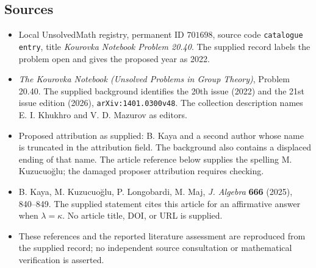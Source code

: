 \documentclass[11pt]{article}
\begin{document}
\subsection{Sources}
\begin{itemize}
\item Local UnsolvedMath registry, permanent ID \(701698\), source code \texttt{catalogue entry}, title \emph{Kourovka Notebook Problem 20.40}. The supplied record labels the problem open and gives the proposed year as 2022.
\item \emph{The Kourovka Notebook (Unsolved Problems in Group Theory)}, Problem 20.40. The supplied background identifies the 20th issue (2022) and the 21st issue edition (2026), \texttt{arXiv:1401.0300v48}. The collection description names E. I. Khukhro and V. D. Mazurov as editors.
\item Proposed attribution as supplied: B. Kaya and a second author whose name is truncated in the attribution field. The background also contains a displaced ending of that name. The article reference below supplies the spelling M. Kuzucuo\u{g}lu; the damaged proposer attribution requires checking.
\item B. Kaya, M. Kuzucuo\u{g}lu, P. Longobardi, M. Maj, \emph{J. Algebra} \textbf{666} (2025), 840--849. The supplied statement cites this article for an affirmative answer when \(\lambda=\kappa\). No article title, DOI, or URL is supplied.
\item These references and the reported literature assessment are reproduced from the supplied record; no independent source consultation or mathematical verification is asserted.
\end{itemize}
\end{document}
